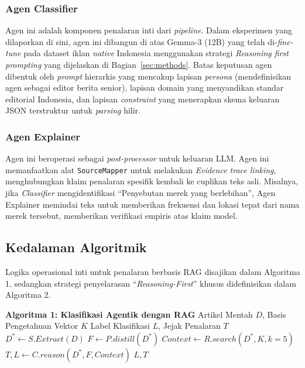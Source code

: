 \documentclass{ieeeaccess}
\begin{document}
\subsubsection{Agen Classifier}
Agen ini adalah komponen penalaran inti dari \textit{pipeline}. Dalam eksperimen yang dilaporkan di sini, agen ini dibangun di atas Gemma-3 (12B) yang telah di-\textit{fine-tune} pada dataset iklan \textit{native} Indonesia menggunakan strategi \textit{Reasoning first prompting} yang dijelaskan di Bagian~\ref{sec:methods}. Batas keputusan agen dibentuk oleh \textit{prompt} hierarkis yang mencakup lapisan \textit{persona} (mendefinisikan agen sebagai editor berita senior), lapisan domain yang menyandikan standar editorial Indonesia, dan lapisan \textit{constraint} yang menerapkan skema keluaran JSON terstruktur untuk \textit{parsing} hilir.

\subsubsection{Agen Explainer}
Agen ini beroperasi sebagai \textit{post-processor} untuk keluaran LLM. Agen ini memanfaatkan alat \texttt{Source\allowbreak Mapper} untuk melakukan \textit{Evidence trace linking}, menghubungkan klaim penalaran spesifik kembali ke cuplikan teks asli. Misalnya, jika \textit{Classifier} mengidentifikasi ``Penyebutan merek yang berlebihan'', Agen Explainer memindai teks untuk memberikan frekuensi dan lokasi tepat dari nama merek tersebut, memberikan verifikasi empiris atas klaim model.

\subsection{Kedalaman Algoritmik}
Logika operasional inti untuk penalaran berbasis RAG disajikan dalam Algoritma 1, sedangkan strategi penyelarasan ``\textit{Reasoning-First}'' khusus didefinisikan dalam Algoritma 2.

\begin{algorithmic}
\STATE \textbf{Algoritma 1: Klasifikasi Agentik dengan RAG}
\REQUIRE Artikel Mentah $D$, Basis Pengetahuan Vektor $K$
\ENSURE Label Klasifikasi $L$, Jejak Penalaran $T$
\STATE $D^* \leftarrow S.Extract(D)$ 
\STATE $F \leftarrow P.distill(D^*)$ 
\STATE $Context \leftarrow R.search(D^*, K, k=5)$ 
\STATE $T, L \leftarrow C.reason(D^*, F, Context)$ 
\RETURN $L, T$
\end{algorithmic}
\end{document}
